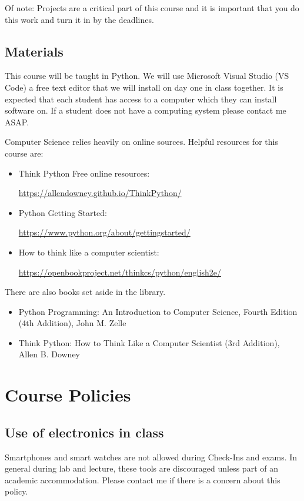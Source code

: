 \documentclass[12pt]{article}
\begin{document}
Of note: Projects are a critical part of this course and it is important that you do this work and turn it in by the deadlines. 

\subsection{Materials}
This course will be taught in Python.
We will use Microsoft Visual Studio (VS Code) a free text editor that we will install on day one in class together.
It is expected that each student has access to a computer which they can install software on.
If a student does not have a computing system please contact me ASAP. 

Computer Science relies heavily on online sources.
Helpful resources for this course are:
\begin{itemize}
\item Think Python Free online resources:

  \url{https://allendowney.github.io/ThinkPython/}

\item Python Getting Started:

  \url{https://www.python.org/about/gettingstarted/}

\item How to think like a computer scientist:

  \url{https://openbookproject.net/thinkcs/python/english2e/}

\end{itemize}

There are also books set aside in the library.
\begin{itemize}
\item Python Programming: An Introduction to Computer Science, Fourth Edition (4th Addition), John M. Zelle
\item Think Python: How to Think Like a Computer Scientist (3rd Addition), Allen B. Downey  
\end{itemize}


\section{Course Policies}

\subsection{Use of electronics in class}
Smartphones and smart watches are not allowed during Check-Ins and exams.
In general during lab and lecture, these tools are discouraged unless part of an academic accommodation.
Please contact me if there is a concern about this policy. 
\end{document}
